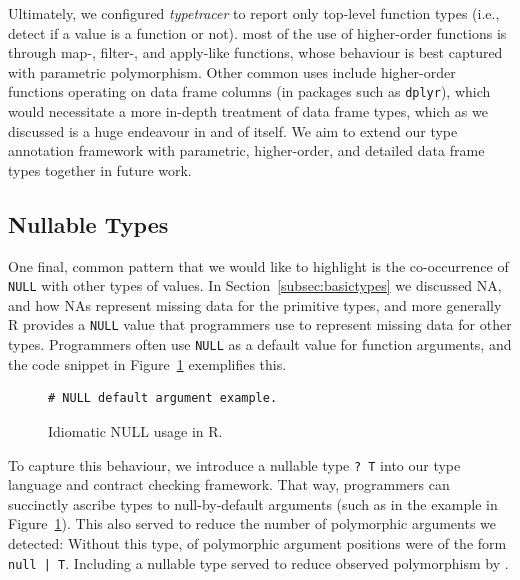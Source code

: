 \documentclass[acmsmall,review,anonymous]{acmart}\settopmatter{printfolios=true,printccs=false,printacmref=false}
\newcommand{\code}[1]{{\lstinline[style=Rin]!#1!}\xspace}
\newcommand{\typetracer}{\emph{typetracer}\xspace} %
\begin{document}
Ultimately, we configured \typetracer to report only top-level function types (i.e., detect if a value is a function or not).
 most of the use of higher-order functions is through map-, filter-, and apply-like functions, whose behaviour is best captured with parametric polymorphism.
Other common uses include higher-order functions operating on data frame columns (in packages such as \code{dplyr}), which would necessitate a more in-depth treatment of data frame types, which as we discussed is a huge endeavour in and of itself.
We aim to extend our type annotation framework with parametric, higher-order, and detailed data frame types together in future work.


%
%
%
%
\subsection{Nullable Types}

One final, common pattern that we would like to highlight is the co-occurrence of \code{NULL} with other types of values.
In Section~\ref{subsec:basictypes} we discussed NA, and how NAs represent missing data for the primitive types, and more generally R provides a \code{NULL} value that programmers use to represent missing data for other types.
Programmers often use \code{NULL} as a default value for function arguments, and the code snippet in Figure~\ref{fig:null} exemplifies this.

\begin{figure}[htbp]
\begin{center}

\begin{lstlisting}
# NULL default argument example. 
\end{lstlisting}

\caption{Idiomatic NULL usage in R.}
\label{fig:null}
\end{center}
\end{figure}

To capture this behaviour, we introduce a nullable type \code{? T} into our type language and contract checking framework.
That way, programmers can succinctly ascribe types to null-by-default arguments (such as in the example in Figure~\ref{fig:null}).
This also served to reduce the number of polymorphic arguments we detected:
Without this type,  of polymorphic argument positions were of the form \code{null | T}.
Including a nullable type served to reduce observed polymorphism by . 

%
%
%
%
\end{document}
